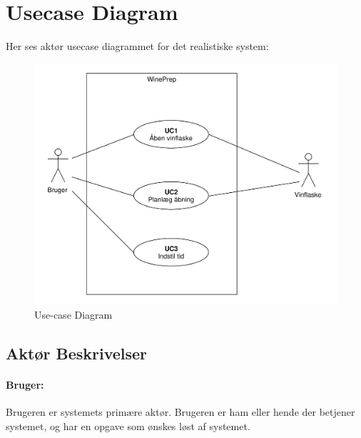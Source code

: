 \section{Usecase Diagram}

Her ses aktør usecase diagrammet for det realistiske system:
\begin{figure}[H]
\centering
\includegraphics[scale=0.5]{usecasediagram.pdf}
\caption[Figur]{Use-case Diagram}
\end{figure}

\subsection{Aktør Beskrivelser}

\paragraph{Bruger:} Brugeren er systemets primære aktør. Brugeren er ham eller hende der betjener systemet, og har en opgave som ønskes løst af systemet.